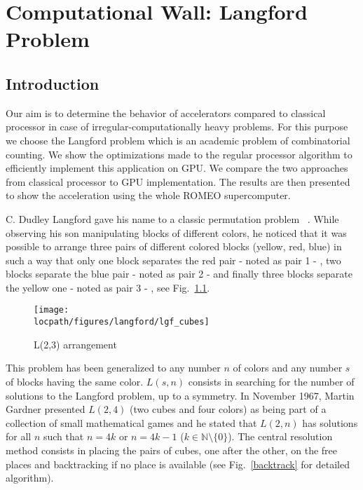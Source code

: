 
\chapter{Computational Wall: Langford Problem}

\section{Introduction}
Our aim is to determine the behavior of accelerators compared to classical processor in case of irregular-computationally heavy problems.
For this purpose we choose the Langford problem which is an academic problem of combinatorial counting.
We show the optimizations made to the regular processor algorithm to efficiently implement this application on GPU. 
We compare the two approaches from classical processor to GPU implementation. 
The results are then presented to show the acceleration using the whole ROMEO supercomputer. 

C. Dudley Langford gave his name to a classic permutation problem ~\cite{Gard56, Simp83}.  
While observing his son manipulating blocks of different colors, he noticed that it was possible to arrange three pairs of different colored blocks (yellow, red, blue) in such a way that only one block separates the red pair - noted as pair 1 - , two blocks separate the blue pair - noted as pair 2 - and finally three blocks separate the yellow one - noted as pair 3 - , see Fig.~\ref{fig:lang}.
  
\begin{figure}[htbp]    
\begin{center}    
\texttt{[image: \\locpath/figures/langford/lgf\_cubes]}   
\caption{L(2,3) arrangement} \label{fig:lang}    
\end{center}
\end{figure}
  
This problem has been generalized to any number $n$ of colors and any number $s$ of blocks having the same color. 
$L(s,n)$ consists in searching for the number of solutions to the Langford problem, up to a symmetry. %
In November 1967, Martin Gardner presented $L(2,4)$ (two cubes and four colors) as being part of a collection of small mathematical games and he stated that $L(2,n)$ has solutions for all $n$ such that $n= 4k$ or $n = 4k-1$ ($k \in \mathbb{N} \setminus \{0\}$). 
The central resolution method consists in placing the pairs of cubes, one after the other, on the free places and backtracking if no place is available (see Fig.~\ref{backtrack} for detailed algorithm).

